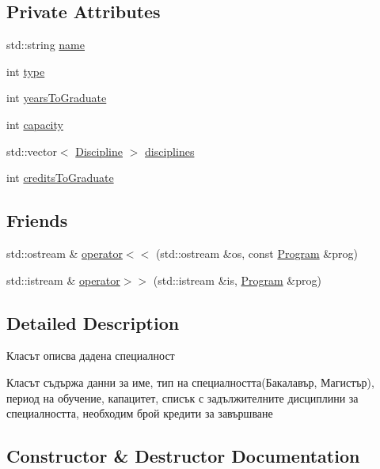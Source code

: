 \subsection*{Private Attributes}
\begin{DoxyCompactItemize}
\item 
std\+::string \hyperlink{class_program_a8644dcfc3d08b475b5fe5ec359f05470}{name}
\item 
int \hyperlink{class_program_ae12d3f37585c3771e4b50832ff0d5b4d}{type}
\item 
int \hyperlink{class_program_a95e24889e5a0ca589d21207b827cb05a}{years\+To\+Graduate}
\item 
int \hyperlink{class_program_a61a9a3d2a973dd289315be7065f91237}{capacity}
\item 
std\+::vector$<$ \hyperlink{class_discipline}{Discipline} $>$ \hyperlink{class_program_aa093662c1b22262af898b454fb00d2e2}{disciplines}
\item 
int \hyperlink{class_program_a609e475b4679c5462133df7f7339ec09}{credits\+To\+Graduate}
\end{DoxyCompactItemize}
\subsection*{Friends}
\begin{DoxyCompactItemize}
\item 
std\+::ostream \& \hyperlink{class_program_a1a2195b7c83054fb960d60b48bca35b0}{operator$<$$<$} (std\+::ostream \&os, const \hyperlink{class_program}{Program} \&prog)
\item 
std\+::istream \& \hyperlink{class_program_a1b59139604420f143cc3eedd6c9134d3}{operator$>$$>$} (std\+::istream \&is, \hyperlink{class_program}{Program} \&prog)
\end{DoxyCompactItemize}


\subsection{Detailed Description}
Класът описва дадена специалност 

Класът съдържа данни за име, тип на специалността(Бакалавър, Магистър), период на обучение, капацитет, списък с задължителните дисциплини за специалността, необходим брой кредити за завършване 

\subsection{Constructor \& Destructor Documentation}
\mbox{\label{class_program_aaefaa0df08f3484476fc4d61e97acbdc}} 
